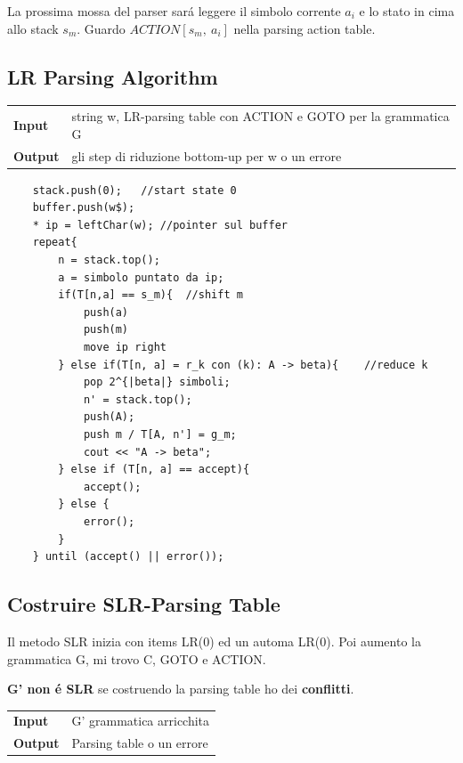 La prossima mossa del parser sar\'a leggere il simbolo corrente $a_i$ e lo stato in cima allo stack $s_m$. 
Guardo $ACTION[s_m,\ a_i]$ nella parsing action table. 

\subsection{LR Parsing Algorithm}

\begin{center}\begin{tabular}{ll}
    \textbf{Input}  &   string w, LR-parsing table con ACTION e GOTO per la grammatica G\\ 
    \textbf{Output} &   gli step di riduzione bottom-up per w o un errore\\
\end{tabular}\end{center}

\begin{lstlisting}
    stack.push(0);   //start state 0
    buffer.push(w$);
    * ip = leftChar(w); //pointer sul buffer
    repeat{
        n = stack.top();
        a = simbolo puntato da ip;
        if(T[n,a] == s_m){  //shift m
            push(a)
            push(m)
            move ip right
        } else if(T[n, a] = r_k con (k): A -> beta){    //reduce k
            pop 2^{|beta|} simboli;
            n' = stack.top(); 
            push(A);
            push m / T[A, n'] = g_m;
            cout << "A -> beta";
        } else if (T[n, a] == accept){
            accept();
        } else {
            error();
        }
    } until (accept() || error());
\end{lstlisting}

\subsection{Costruire SLR-Parsing Table}

Il metodo SLR inizia con items LR(0) ed un automa LR(0). Poi aumento la grammatica G, mi trovo C, GOTO e ACTION.\\[10pt]

\begin{tcolorbox}\begin{center}
    \textbf{G' non \'e SLR} se costruendo la parsing table ho dei \textbf{conflitti}. 
\end{center}\end{tcolorbox}

\begin{center}\begin{tabular}{ll}
    \textbf{Input}  &   G' grammatica arricchita\\ 
    \textbf{Output} &   Parsing table o un errore\\
\end{tabular}\end{center}


